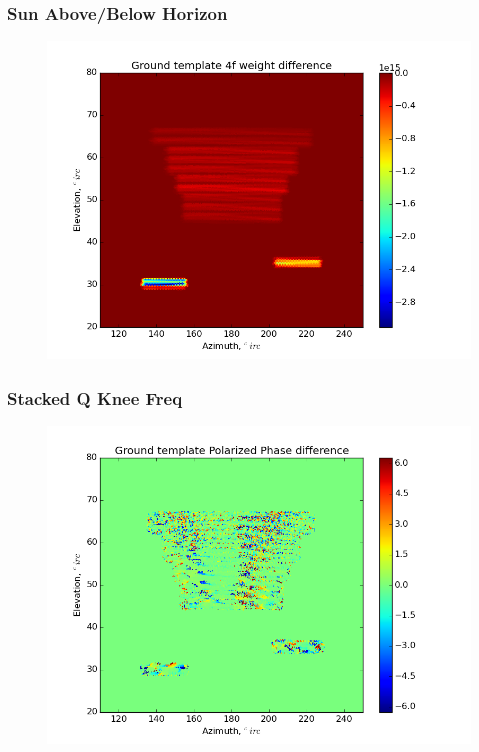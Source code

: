 \documentclass{beamer}
\begin{document}
\begin{frame}
\frametitle{Sun Above/Below Horizon}
\begin{figure}
\includegraphics[width=0.9\linewidth]{dw4_gt_SUN_HORIZON.png}
\end{figure}
\end{frame}

\begin{frame}
\frametitle{Stacked Q Knee Freq}
\begin{figure}
\includegraphics[width=0.9\linewidth]{dArg_gt_STACK_Q_FKNEE.png}
\end{figure}
\end{frame}
\end{document}
